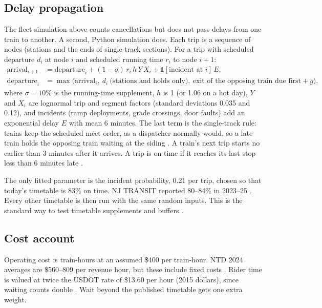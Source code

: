 \documentclass[11pt]{article}
\begin{document}
\subsection{Delay propagation}\label{sec:delaymodel}
The fleet simulation above counts cancellations but does not pass delays from one train to another. A second, Python simulation does. Each trip is a sequence of nodes (stations and the ends of single-track sections). For a trip with scheduled departure $d_i$ at node $i$ and scheduled running time $r_i$ to node $i+1$:
\begin{align}
\text{arrival}_{i+1} &= \text{departure}_i + (1-\sigma)\,r_i\,h\,Y\,X_i + \mathbb{1}[\text{incident at } i]\,E, \\
\text{departure}_{i} &= \max\bigl(\text{arrival}_i,\ d_i\ \text{(stations and holds only)},\ \text{exit of the opposing train due first} + g\bigr),
\end{align}
where $\sigma=10\%$ is the running-time supplement, $h$ is 1 (or 1.06 on a hot day), $Y$ and $X_i$ are lognormal trip and segment factors (standard deviations 0.035 and 0.12), and incidents (ramp deployments, grade crossings, door faults) add an exponential delay $E$ with mean 6 minutes. The last term is the single-track rule: trains keep the scheduled meet order, as a dispatcher normally would, so a late train holds the opposing train waiting at the siding \citep{carey1995model,higgins1996optimal}. A train's next trip starts no earlier than 3 minutes after it arrives. A trip is on time if it reaches its last stop less than 6 minutes late \citep{njt2019otp}.

The only fitted parameter is the incident probability, 0.21 per trip, chosen so that today's timetable is 83\% on time. NJ TRANSIT reported 80--84\% in 2023--25 \citep{roinj2025riverline}. Every other timetable is then run with the same random inputs. This is the standard way to test timetable supplements and buffers \citep{kroon2008stochastic,vanoort2010reliability}.

\subsection{Cost account}
Operating cost is train-hours at an assumed \$400 per train-hour. NTD 2024 averages are \$560--809 per revenue hour, but these include fixed costs \citep{ntd_metrics}. Rider time is valued at twice the USDOT rate of \$13.60 per hour (2015 dollars), since waiting counts double \citep{usdot2016vtts}. Wait beyond the published timetable gets one extra weight.
\end{document}

